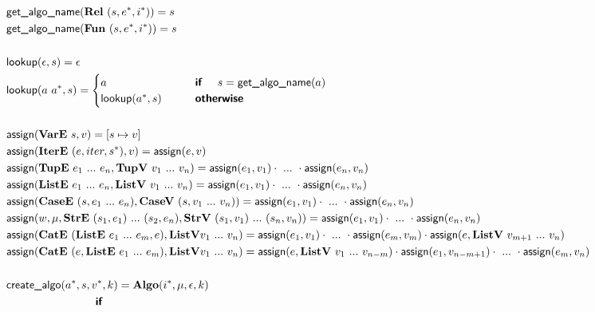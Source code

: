 \begin{align*}
%
\newline \\
  &\getalgoname(\rel ~ (s, \seq e, \seq i)) = s \\
  &\getalgoname(\fun ~ (s, \seq e, \seq i)) = s \\
%
\newline \\
  &\lookup(\epsilon, s) = \epsilon \\
  &\lookup(a ~ \seq{a}, s) =
    \begin{cases}
      a &\quad\quad \premise{if}\quad ~ s = \getalgoname(a) \\
      \lookup(\seq{a}, s) &\quad\quad \premise{otherwise}
    \end{cases}
  \\
%
\newline \\
  &\assign(\vare ~ s, v) = [s \mapsto v] \\
  &\assign(\itere ~ (e, iter, s^*), v) = \assign(e, v) \\
  &\assign(\tupe ~ e_1 ~ ... ~ e_n, \tupv ~ v_1 ~ ... ~ v_n) =
    \assign(e_1, v_1) \cdot ~ ... ~ \cdot \assign(e_n, v_n) \\
  &\assign(\liste ~ e_1 ~ ... ~ e_n, \listv ~ v_1 ~ ... ~ v_n) =
    \assign(e_1, v_1) \cdot ~ ... ~ \cdot \assign(e_n, v_n) \\
  &\assign(\casee ~ (s, e_1 ~ ... ~ e_n), \casev ~ (s, v_1 ~ ... ~ v_n)) =
    \assign(e_1, v_1) \cdot ~ ... ~ \cdot \assign(e_n, v_n) \\
  &\assign(
    w,
    \mu,
    \stre ~ (s_1, e_1) ~ ... ~ (s_2, e_n),
    \strv ~ (s_1, v_1) ~ ... ~ (s_n, v_n)
  ) =
    \assign(e_1, v_1) \cdot ~ ... ~ \cdot \assign(e_n, v_n) \\
  &\assign(\cate ~ (\liste ~ e_1 ~ ... ~ e_m, e), \listv v_1 ~ ... ~ v_n) =
    \assign(e_1, v_1) \cdot ~ ... ~ \cdot \assign(e_m, v_m) \cdot
    \assign(e, \listv ~ v_{m+1} ~ ... ~ v_n) \\
  &\assign(\cate ~ (e, \liste ~ e_1 ~ ... ~ e_m), \listv v_1 ~ ... ~ v_n) =
    \assign(e, \listv ~ v_1 ~ ... ~ v_{n-m}) \cdot
    \assign(e_1, v_{n-m+1}) \cdot ~ ... ~ \cdot \assign(e_m, v_n) \\
%
\newline \\
  &\createalgo(\seq a, s, \seq v, k) =
  \algo(\seq i, \mu, \epsilon, k) \\
  &\qquad\qquad\qquad\qquad\premise{if}\quad

\end{align*}
